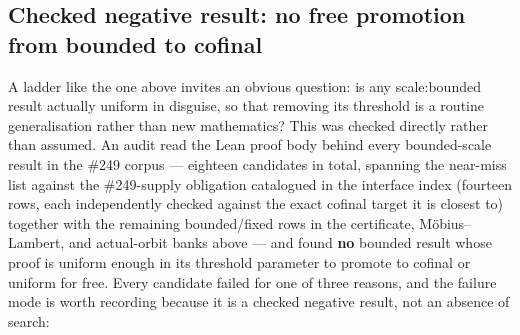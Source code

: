 \documentclass[11pt]{article}
\theoremstyle{breakplain}
\theoremstyle{breakdefinition}
\theoremstyle{breakdefinition}
\newcommand{\scale}[1]{{\small\textsf{scale:#1}}\xspace}
\begin{document}
\subsection{Checked negative result: no free promotion from bounded to cofinal}

A ladder like the one above invites an obvious question: is any \scale{bounded} result actually
uniform in disguise, so that removing its threshold is a routine generalisation rather than new
mathematics? This was checked directly rather than assumed. An audit read the Lean proof body
behind every bounded-scale result in the \#249 corpus — eighteen candidates in total, spanning
the near-miss list against the \#249-supply obligation catalogued in the interface index (fourteen
rows, each independently checked against the exact cofinal target it is closest to) together with
the remaining bounded/fixed rows in the certificate, M\"obius--Lambert, and actual-orbit banks
above — and found \textbf{no} bounded result whose proof is uniform enough in its threshold
parameter to promote to cofinal or uniform for free. Every candidate failed for one of three
reasons, and the failure mode is worth recording because it is a checked negative result, not an
absence of search:
\end{document}
